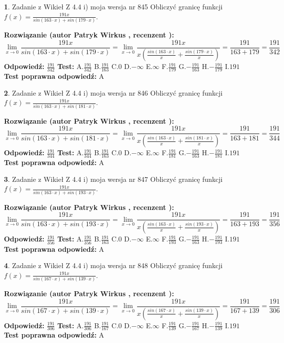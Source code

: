 \documentclass[12pt, a4paper]{article}
\theoremstyle{definition} %
\newtheorem{zad}{}
\newcommand{\zadStart}[1]{\begin{zad}#1\newline}
\newcommand{\zadStop}{\end{zad}}
\newcommand{\rozwStart}[2]{\noindent \textbf{Rozwiązanie (autor #1 , recenzent #2): }\newline}
\newcommand{\rozwStop}{\newline}
\newcommand{\odpStart}{\noindent \textbf{Odpowiedź:}\newline}
\newcommand{\odpStop}{\newline}
\newcommand{\testStart}{\noindent \textbf{Test:}\newline}
\newcommand{\testStop}{\newline}
\newcommand{\kluczStart}{\noindent \textbf{Test poprawna odpowiedź:}\newline}
\newcommand{\kluczStop}{\newline}
\begin{document}
\zadStart{Zadanie z Wikieł Z 4.4 i) moja wersja nr 845}
Obliczyć granicę funkcji $f(x)=\frac{191x}{sin(163\cdot x) +sin(179\cdot x)}$.
\zadStop
\rozwStart{Patryk Wirkus}{}
$$\lim\limits_{x\to 0}\frac{191x}{sin(163\cdot x) +sin(179\cdot x)}=\lim\limits_{x\to 0}\frac{191x}{x(\frac{sin(163\cdot x)}{x}+\frac{sin(179\cdot x)}{x})}=\frac{191}{163+179} = \frac{191}{342}$$
\rozwStop
\odpStart
$\frac{191}{342}$
\odpStop
\testStart
A.$\frac{191}{342}$
B.$\frac{191}{163}$
C.$0$
D.$-\infty$
E.$\infty$
F.$\frac{191}{179}$
G.$-\frac{191}{163}$
H.$-\frac{191}{179}$
I.$191$
\testStop
\kluczStart
A
\kluczStop



\zadStart{Zadanie z Wikieł Z 4.4 i) moja wersja nr 846}
Obliczyć granicę funkcji $f(x)=\frac{191x}{sin(163\cdot x) +sin(181\cdot x)}$.
\zadStop
\rozwStart{Patryk Wirkus}{}
$$\lim\limits_{x\to 0}\frac{191x}{sin(163\cdot x) +sin(181\cdot x)}=\lim\limits_{x\to 0}\frac{191x}{x(\frac{sin(163\cdot x)}{x}+\frac{sin(181\cdot x)}{x})}=\frac{191}{163+181} = \frac{191}{344}$$
\rozwStop
\odpStart
$\frac{191}{344}$
\odpStop
\testStart
A.$\frac{191}{344}$
B.$\frac{191}{163}$
C.$0$
D.$-\infty$
E.$\infty$
F.$\frac{191}{181}$
G.$-\frac{191}{163}$
H.$-\frac{191}{181}$
I.$191$
\testStop
\kluczStart
A
\kluczStop



\zadStart{Zadanie z Wikieł Z 4.4 i) moja wersja nr 847}
Obliczyć granicę funkcji $f(x)=\frac{191x}{sin(163\cdot x) +sin(193\cdot x)}$.
\zadStop
\rozwStart{Patryk Wirkus}{}
$$\lim\limits_{x\to 0}\frac{191x}{sin(163\cdot x) +sin(193\cdot x)}=\lim\limits_{x\to 0}\frac{191x}{x(\frac{sin(163\cdot x)}{x}+\frac{sin(193\cdot x)}{x})}=\frac{191}{163+193} = \frac{191}{356}$$
\rozwStop
\odpStart
$\frac{191}{356}$
\odpStop
\testStart
A.$\frac{191}{356}$
B.$\frac{191}{163}$
C.$0$
D.$-\infty$
E.$\infty$
F.$\frac{191}{193}$
G.$-\frac{191}{163}$
H.$-\frac{191}{193}$
I.$191$
\testStop
\kluczStart
A
\kluczStop



\zadStart{Zadanie z Wikieł Z 4.4 i) moja wersja nr 848}
Obliczyć granicę funkcji $f(x)=\frac{191x}{sin(167\cdot x) +sin(139\cdot x)}$.
\zadStop
\rozwStart{Patryk Wirkus}{}
$$\lim\limits_{x\to 0}\frac{191x}{sin(167\cdot x) +sin(139\cdot x)}=\lim\limits_{x\to 0}\frac{191x}{x(\frac{sin(167\cdot x)}{x}+\frac{sin(139\cdot x)}{x})}=\frac{191}{167+139} = \frac{191}{306}$$
\rozwStop
\odpStart
$\frac{191}{306}$
\odpStop
\testStart
A.$\frac{191}{306}$
B.$\frac{191}{167}$
C.$0$
D.$-\infty$
E.$\infty$
F.$\frac{191}{139}$
G.$-\frac{191}{167}$
H.$-\frac{191}{139}$
I.$191$
\testStop
\kluczStart
A
\kluczStop
\end{document}
